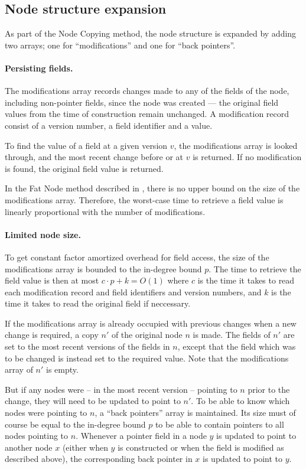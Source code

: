\subsection{Node structure expansion}
\label{subsec:node-structure-expansion}
As part of the Node Copying method, the node structure is expanded by adding two
arrays; one for ``modifications'' and one for ``back pointers''.

\paragraph{Persisting fields.}

The modifications array records changes made to any of the fields of the
node, including non-pointer fields, since the node was created --- the original
field values from the time of construction remain unchanged. A modification
record consist of a version number, a field identifier and a value.

To find the value of a field at a given version $v$, the modifications array is
looked through, and the most recent change before or at $v$ is returned. If no
modification is found, the original field value is returned.

In the Fat Node method described in \cite{Driscoll198986}, there is no upper
bound on the size of the modifications array. Therefore, the worst-case time to
retrieve a field value is linearly proportional with the number of
modifications.

\paragraph{Limited node size.}

To get constant factor amortized overhead for field access, the size of the
modifications array is bounded to the in-degree bound $p$. The time to retrieve
the field value is then at most $c \cdot p + k = O(1)$ where $c$ is the time it
takes to read each modification record and field identifiers and version
numbers, and $k$ is the time it takes to read the original field if neccessary.

If the modifications array is already occupied with previous changes when a new
change is required, a copy $n'$ of the original node $n$ is made. The fields of
$n'$ are set to the most recent versions of the fields in $n$, except that the
field which was to be changed is instead set to the required value. Note that
the modifications array of $n'$ is empty.

But if any nodes were -- in the most recent version -- pointing to $n$ prior to
the change, they will need to be updated to point to $n'$. To be able to know
which nodes were pointing to $n$, a ``back pointers'' array is maintained. Its
size must of course be equal to the in-degree bound $p$ to be able to contain
pointers to all nodes pointing to $n$. Whenever a pointer field in a node $y$ is
updated to point to another node $x$ (either when $y$ is constructed or when the
field is modified as described above), the corresponding back pointer in $x$ is
updated to point to $y$.

